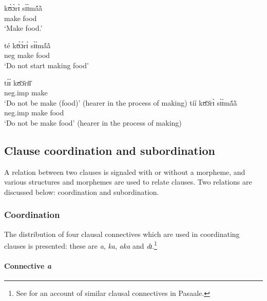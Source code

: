 \begin{multicols}{2}
 
 

\ea\label{ex:GRM-neg-fut-pres}

 \ea\label{ex:GRM-neg-fut}
\gll  kʊ̀ɔ̀rɪ̀ sɪ̀ɪ̀mã́ã̀\\
  make food\\
 \glt `Make food.'
 
 
 \ex\label{ex:GRM-neg-pres}
\gll  té kʊ́ɔ́rɪ́ sɪ̀ɪ̀mã́ã̀\\ 
{\sc neg}  make food\\
 \glt `Do not start making food'
 \vfill
 \columnbreak
 
  \ex\label{ex:GRM-neg-pres}
  \gll  tɪ́ɪ́ kʊ̄ɔ̄rɪ̄ɪ̄\\
 {\sc neg.imp}  make\\
 \glt `Do not be make (food)' (hearer in the process of making)
   \ex\label{ex:GRM-neg-pres}
  \gll  tíí kʊ̄ɔ̄rɪ̀  sɪ̀ɪ̀mã́ã̀\\
 {\sc neg.imp}  make  food\\
 \glt `Do not be make food' (hearer in the process of making)
\z
\z

\end{multicols}




\subsection{Clause coordination and subordination}
\label{GRM-clause-coord-subord}

A relation between two clauses is signaled with or without a morpheme,  and 
various  structures and morphemes  are used to relate clauses.  Two
relations are discussed below: coordination and subordination. 

\subsubsection{Coordination}
\label{GRM-clause-coord}


The distribution of four clausal connectives which are used in coordinating
clauses is presented: these are {\it a}, {\it ka}, {\it aka} and {\it 
dɪ}.\footnote{See \citet[143--149]{Mcgi99} for an account of similar clausal
connectives in Pasaale.}  


\paragraph{Connective {\it a}}
\label{GRM-clause-coord-a}

